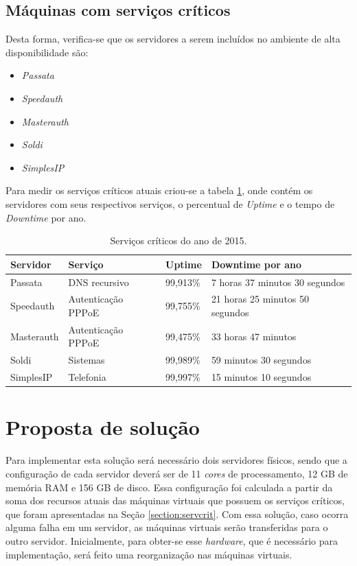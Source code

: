 \subsection{Máquinas com serviços críticos}
\label{section:maqservcrit}

Desta forma, verifica-se que os servidores a serem incluídos no ambiente de alta disponibilidade são:
\begin{itemize}
 \item \textit{Passata}
 \item \textit{Speedauth}
 \item \textit{Masterauth}
 \item \textit{Soldi}
 \item \textit{SimplesIP}
\end{itemize}

Para medir os serviços críticos atuais criou-se a tabela \ref{tab:dispservcrit}, onde contém os servidores com seus respectivos serviços, o
percentual de \textit{Uptime} e o tempo de \textit{Downtime} por ano.

\begin{table}[h!]
\caption{Serviços críticos do ano de 2015.}
\label{tab:dispservcrit}
\begin{center}
\begin{tabular}{|l|l|l|l|}\hline
Servidor & Serviço & Uptime & Downtime por ano \\\hline
Passata & DNS recursivo & 99,913\% & 7 horas 37 minutos 30 segundos \\\hline
Speedauth & Autenticação PPPoE & 99,755\% & 21 horas 25 minutos 50 segundos \\\hline
Masterauth & Autenticação PPPoE & 99,475\% & 33 horas 47 minutos\\\hline
Soldi & Sistemas & 99,989\% & 59 minutos 30 segundos \\\hline
SimplesIP & Telefonia & 99,997\% & 15 minutos 10 segundos \\\hline
\end{tabular}
\end{center}
\end{table}

\section{Proposta de solução}
\label{section:propostasolucao}

Para implementar esta solução será necessário dois servidores físicos, sendo que a configuração de cada servidor deverá ser de 
11 \textit{cores} de processamento, 12 GB de memória \ac{RAM} e 156 GB de disco. Essa configuração foi calculada a partir da soma dos recursos 
atuais das máquinas virtuais que possuem os serviços críticos, que foram apresentadas na Seção \ref{section:servcrit}.
Com essa solução, caso ocorra alguma falha em um servidor, as máquinas virtuais serão transferidas para o outro servidor.
Inicialmente, para obter-se esse \textit{hardware}, que é necessário para implementação, será feito uma reorganização nas máquinas virtuais.

